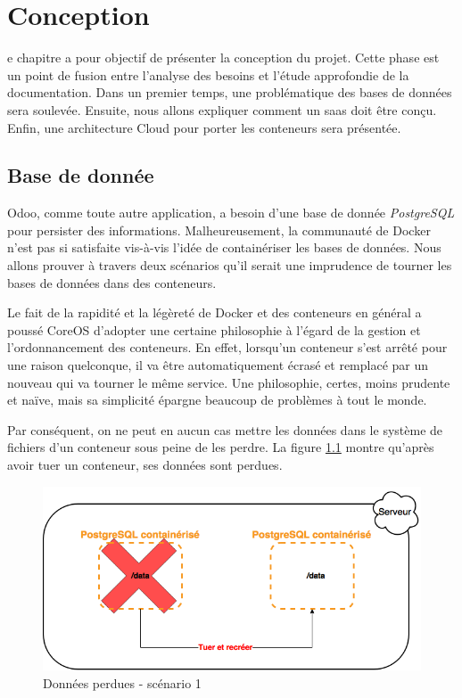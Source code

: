 \chapter{Conception}
\begin{onehalfspace}

e chapitre a pour objectif de présenter la conception du projet. Cette phase est un point de fusion entre l'analyse des besoins et l'étude approfondie de la documentation. Dans un premier temps, une problématique des bases de données sera soulevée. Ensuite, nous allons expliquer comment un \acrshort{saas} doit être conçu. Enfin, une architecture Cloud pour porter les conteneurs sera présentée.

\newpage

\section{Base de donnée}



Odoo, comme toute autre application, a besoin d'une base de donnée \emph{PostgreSQL} pour persister des informations. Malheureusement, la communauté de Docker n'est pas si satisfaite vis-à-vis l'idée de containériser les bases de données. Nous allons prouver à travers deux scénarios qu'il serait une imprudence de tourner les bases de données dans des conteneurs.

Le fait de la rapidité et la légèreté de Docker et des conteneurs en général a poussé CoreOS d'adopter une certaine philosophie à l'égard de la gestion et l'ordonnancement des conteneurs. En effet, lorsqu'un conteneur s'est arrêté pour une raison quelconque, il va être automatiquement écrasé et remplacé par un nouveau qui va tourner le même service. Une philosophie, certes, moins prudente et naïve, mais sa simplicité épargne beaucoup de problèmes à tout le monde.

Par conséquent, on ne peut en aucun cas mettre les données dans le système de fichiers d'un conteneur sous peine de les perdre. La figure \ref{fig:database1} montre qu'après avoir tuer un conteneur, ses données sont perdues.

\begin{figure}[H]
\centering
\includegraphics [scale=0.5]{chapitre4/assets/database1}
\caption{Données perdues - scénario 1}
\label{fig:database1}
\end{figure}


\end{onehalfspace}
